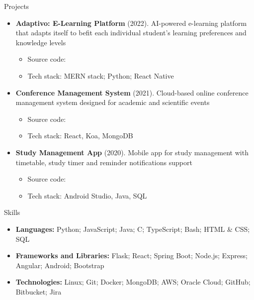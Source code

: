 \documentclass[garamond, a4paper]{modest-cv}
\begin{document}
	\begin{cvsection}{Projects}
		\begin{cvsubsection}{}{}{}
			\begin{itemize}
				\item \textbf{Adaptivo: E-Learning Platform} (2022). AI-powered e-learning platform that adapts itself to befit each individual student's learning preferences and knowledge levels
				\begin{itemize}
					\item Source code: \small {}
					\item Tech stack: MERN stack; Python; React Native
				\end{itemize}
				
				\item \textbf{Conference Management System} (2021). Cloud-based online conference management system designed for academic and scientific events
				\begin{itemize}
					\item Source code: \small {}
					\item Tech stack: React, Koa, MongoDB
				\end{itemize}
				
				\item \textbf{Study Management App} (2020). Mobile app for study management with timetable, study timer and reminder notifications support
				\begin{itemize}
					\item Source code: \small {}
					\item Tech stack: Android Studio, Java, SQL
				\end{itemize}
			\end{itemize}
		\end{cvsubsection}
	\end{cvsection}

	\begin{cvsection}{Skills}
		\begin{cvsubsection}{}{}{}	
			\begin{itemize}
				\item \textbf{Languages:} Python; JavaScript; Java; C; TypeScript; Bash; HTML \& CSS; SQL
				\item \textbf{Frameworks and Libraries:} Flask; React; Spring Boot; Node.js; Express; Angular; Android; Bootstrap
				\item \textbf{Technologies:} Linux; Git; Docker; MongoDB; AWS; Oracle Cloud; GitHub; Bitbucket; Jira
			\end{itemize}
		\end{cvsubsection}
	\end{cvsection}
\end{document}
